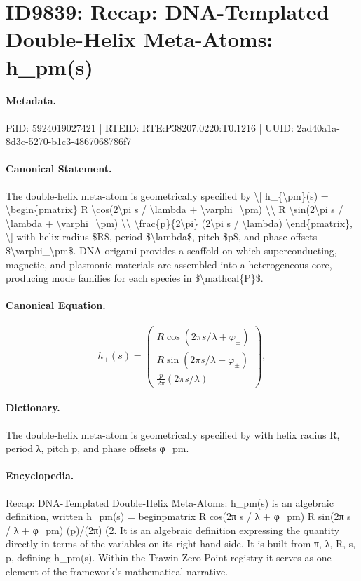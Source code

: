 \section*{ID9839: Recap: DNA-Templated Double-Helix Meta-Atoms: h\_pm(s)}
\paragraph{Metadata.}
PiID: 5924019027421 | RTEID: RTE:P38207.0220:T0.1216 | UUID: 2ad40a1a-8d3c-5270-b1c3-4867068786f7

\paragraph{Canonical Statement.}
The double-helix meta-atom is geometrically specified by \textbackslash{}[ h\_\{\textbackslash{}pm\}(s) = \textbackslash{}begin\{pmatrix\} R \textbackslash{}cos(2\textbackslash{}pi s / \textbackslash{}lambda + \textbackslash{}varphi\_\textbackslash{}pm) \textbackslash{}\textbackslash{} R \textbackslash{}sin(2\textbackslash{}pi s / \textbackslash{}lambda + \textbackslash{}varphi\_\textbackslash{}pm) \textbackslash{}\textbackslash{} \textbackslash{}frac\{p\}\{2\textbackslash{}pi\} (2\textbackslash{}pi s / \textbackslash{}lambda) \textbackslash{}end\{pmatrix\}, \textbackslash{}] with helix radius \$R\$, period \$\textbackslash{}lambda\$, pitch \$p\$, and phase offsets \$\textbackslash{}varphi\_\textbackslash{}pm\$. DNA origami provides a scaffold on which superconducting, magnetic, and plasmonic materials are assembled into a heterogeneous core, producing mode families for each species in \$\textbackslash{}mathcal\{P\}\$.

\paragraph{Canonical Equation.}
\[
h_{\pm}(s) = \begin{pmatrix} R \cos(2\pi s / \lambda + \varphi_\pm) \\ R \sin(2\pi s / \lambda + \varphi_\pm) \\ \frac{p}{2\pi} (2\pi s / \lambda) \end{pmatrix},
\]

\paragraph{Dictionary.}
The double-helix meta-atom is geometrically specified by with helix radius R, period λ, pitch p, and phase offsets φ\_pm.

\paragraph{Encyclopedia.}
Recap: DNA-Templated Double-Helix Meta-Atoms: h\_pm(s) is an algebraic definition, written h\_pm(s) = beginpmatrix R cos(2π s / λ + φ\_pm) R sin(2π s / λ + φ\_pm) (p)/(2π) (2. It is an algebraic definition expressing the quantity directly in terms of the variables on its right-hand side. It is built from π, λ, R, s, p, defining h\_pm(s). Within the Trawin Zero Point registry it serves as one element of the framework's mathematical narrative.
